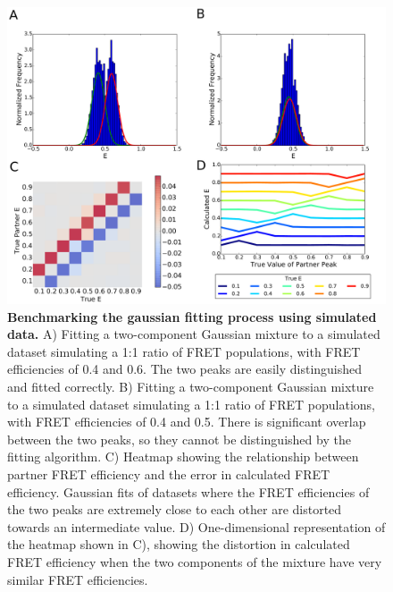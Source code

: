 \begin{figure}[!ht]
   \begin{center}
      \includegraphics*[clip=true, width=6in]{pyFRET/benchmarking.pdf}
      \caption{{\bf Benchmarking the gaussian fitting process using simulated data.} A) Fitting a two-component Gaussian mixture to a simulated dataset simulating a 1:1 ratio of FRET populations, with FRET efficiencies of 0.4 and 0.6. The two peaks are easily distinguished and fitted correctly. B) Fitting a two-component Gaussian mixture to a simulated dataset simulating a 1:1 ratio of FRET populations, with FRET efficiencies of 0.4 and 0.5. There is significant overlap between the two peaks, so they cannot be distinguished by the fitting algorithm. C) Heatmap showing the relationship between partner FRET efficiency and the error in calculated FRET efficiency. Gaussian fits of datasets where the FRET efficiencies of the two peaks are extremely close to each other are distorted towards an intermediate value. D) One-dimensional representation of the heatmap shown in C), showing the distortion in calculated FRET efficiency when the two components of the mixture have very similar FRET efficiencies.}
      \label{fig:fig_benchmarking}
   \end{center}
\end{figure}

